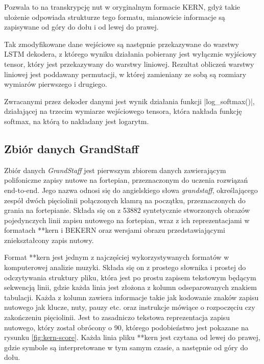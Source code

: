 Pozwala to na transkrypcję nut w oryginalnym formacie KERN, gdyż takie ułożenie odpowiada strukturze tego formatu, mianowicie informacje są zapisywane od góry do dołu i od lewej do prawej.

Tak zmodyfikowane dane wejściowe są następnie przekazywane do warstwy LSTM dekodera, z którego wyniku działania pobierany jest wyłącznie wyjściowy tensor, który jest przekazywany do warstwy liniowej. Rezultat obliczeń warstwy liniowej jest poddawany permutacji, w której zamieniany ze sobą są rozmiary wymiarów pierwszego i drugiego.

Zwracanymi przez dekoder danymi jest wynik działania funkcji \pyth|log_softmax()|, działającej na trzecim wymiarze wejściowego tensora, która nakłada funkcję softmax, na którą to nakładany jest logarytm.

\subsection{Zbiór danych GrandStaff}

Zbiór danych \textit{GrandStaff} jest pierwszym zbiorem danych zawierającym polifoniczne zapisy nutowe na fortepian, przeznaczonym do uczenia rozwiązań end-to-end. Jego nazwa odnosi się do angielskiego słowa \textit{grandstaff}, określającego zespół dwóch pięciolinii połączonych klamrą na początku, przeznaczonych do grania na fortepianie.
Składa się on z 53882 syntetycznie stworzonych obrazów pojedynczych linii zapisu nutowego na fortepian, wraz z ich reprezentacjami w formatach **kern i BEKERN oraz wersjami obrazu przedstawiającymi zniekształcony zapis nutowy.

Format **kern jest jednym z najczęściej wykorzystywanych formatów w komputerowej analizie muzyki. Składa się on z prostego słownika i prostej do odczytywania struktury pliku, która jest po prostu zapisem tekstowym będącym sekwencją linii, gdzie każda linia jest złożona z kolumn odseparowanych znakiem tabulacji. Każda z kolumn zawiera informacje takie jak kodowanie znaków zapisu nutowego jak klucze, nuty, pauzy etc. oraz instrukcje mówiące o rozpoczęciu czy zakończeniu pięciolinii. Jest to zasadniczo tekstowa reprezentacja zapisu nutowego, który został obrócony o 90\degree, którego podobieństwo jest pokazane na rysunku \ref{fig:kern-score}. Każda linia pliku **kern jest czytana od lewej do prawej, gdzie symbole są interpretowane w tym samym czasie, a następnie od góry do dołu.

